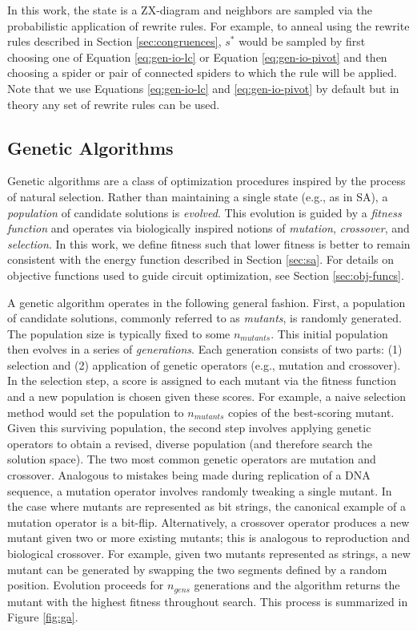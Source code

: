In this work, the state is a ZX-diagram and neighbors are sampled via the probabilistic application of rewrite rules.
For example, to anneal using the rewrite rules described in Section \ref{sec:congruences}, $s^*$ would be sampled by first choosing one of Equation \ref{eq:gen-io-lc} or Equation \ref{eq:gen-io-pivot} and then choosing a spider or pair of connected spiders to which the rule will be applied.
Note that we use Equations \ref{eq:gen-io-lc} and \ref{eq:gen-io-pivot} by default but in theory any set of rewrite rules can be used.

\subsection{Genetic Algorithms}

Genetic algorithms are a class of optimization procedures inspired by the process of natural selection.
Rather than maintaining a single state (e.g., as in SA), a \emph{population} of candidate solutions is \emph{evolved}.
This evolution is guided by a \emph{fitness function} and operates via biologically inspired notions of \emph{mutation}, \emph{crossover}, and \emph{selection}.
In this work, we define fitness such that lower fitness is better to remain consistent with the energy function described in Section \ref{sec:sa}.
For details on objective functions used to guide circuit optimization, see Section \ref{sec:obj-funcs}.

A genetic algorithm operates in the following general fashion.
First, a population of candidate solutions, commonly referred to as \emph{mutants}, is randomly generated.
The population size is typically fixed to some $n_{mutants}$.
This initial population then evolves in a series of \emph{generations}.
Each generation consists of two parts: (1) selection and (2) application of genetic operators (e.g., mutation and crossover).
In the selection step, a score is assigned to each mutant via the fitness function and a new population is chosen given these scores.
For example, a naive selection method would set the population to $n_{mutants}$ copies of the best-scoring mutant.
Given this surviving population, the second step involves applying genetic operators to obtain a revised, diverse population (and therefore search the solution space).
The two most common genetic operators are mutation and crossover.
Analogous to mistakes being made during replication of a DNA sequence, a mutation operator involves randomly tweaking a single mutant.
In the case where mutants are represented as bit strings, the canonical example of a mutation operator is a bit-flip.
Alternatively, a crossover operator produces a new mutant given two or more existing mutants;
this is analogous to reproduction and biological crossover.
For example, given two mutants represented as strings, a new mutant can be generated by swapping the two segments defined by a random position.
Evolution proceeds for $n_{gens}$ generations and the algorithm returns the mutant with the highest fitness throughout search.
This process is summarized in Figure \ref{fig:ga}.

